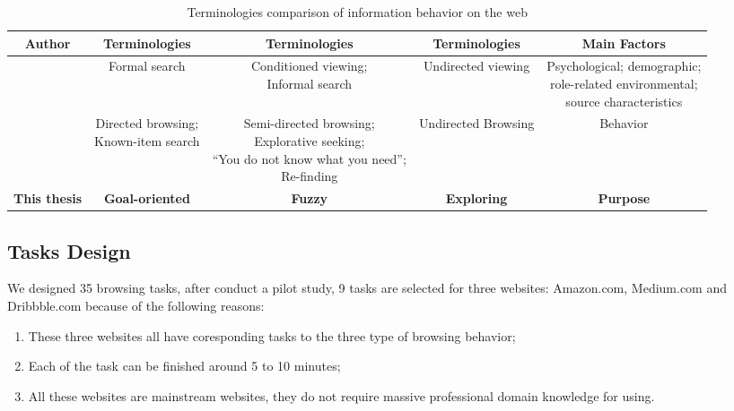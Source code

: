 \begin{table}[H]
    \small
    \centering
    \caption{Terminologies comparison of information behavior on the web}
    \begin{adjustbox}{width=\textwidth}
        \begin{tabular}{ccccc}
            \toprule
            \textbf{Author} & \textbf{Terminologies} & \textbf{Terminologies} & \textbf{Terminologies} & \textbf{Main Factors} \\
            \hline
            \cite{choo1999information} & Formal search & \makecell{Conditioned viewing; \\ Informal search} & Undirected viewing & \makecell{Psychological; demographic;\\ role-related environmental; \\source characteristics} \\
            \cite{johnson2017patterns} & \makecell{Directed browsing; \\Known-item search} & \makecell{Semi-directed browsing; \\Explorative seeking; \\``You do not know what you need''; \\Re-finding} & Undirected Browsing & Behavior \\
            \textbf{This thesis} & \textbf{Goal-oriented} & \textbf{Fuzzy} & \textbf{Exploring} & \textbf{Purpose} \\
            \bottomrule
        \end{tabular}
        \label{table:ellis}
    \end{adjustbox}
\end{table}

\subsection{Tasks Design}
\label{sec:task-design}

We designed 35 browsing tasks, after conduct a pilot study, 
9 tasks are selected for three websites: Amazon.com, Medium.com and Dribbble.com 
because of the following reasons:

\begin{enumerate}
    \item These three websites all have coresponding tasks to the three type of browsing behavior;
    \item Each of the task can be finished around 5 to 10 minutes;
    \item All these websites are mainstream websites, they do not require 
        massive professional domain knowledge for using.
\end{enumerate}

